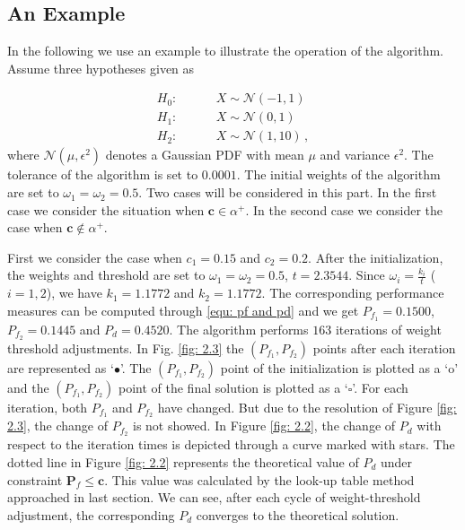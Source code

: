 \subsection{An Example}
In the following we use an example to illustrate the operation of the algorithm. Assume three hypotheses given as

\begin{equation}
\label{equ: Gaussian Hypothesis}
\begin{split}
	H_0:\;\;\;\;\;\;\;\;&X \sim \mathcal{N}(-1,1)\\
    H_1:\;\;\;\;\;\;\;\;&X \sim \mathcal{N}(0,1)\\
    H_2:\;\;\;\;\;\;\;\;&X \sim \mathcal{N}(1,10)\,,
\end{split}
\end{equation}
where $\mathcal{N}(\mu, \epsilon^2)$ denotes a Gaussian PDF with mean $\mu$ and variance $\epsilon^2$.
The tolerance of the algorithm is set to $0.0001$. The initial weights of the algorithm are set to $\omega_1 = \omega_2 = 0.5$. 
Two cases will be considered in this part. In the first case we consider the situation when $\mathbf{c} \in \alpha^+$. In the second case we consider the case when $\mathbf{c} \notin \alpha^+$.

First we consider the case when $c_1 = 0.15$ and $c_2 = 0.2$.
After the initialization, the weights and threshold are set to $\omega_1 = \omega_2 = 0.5$, $t =2.3544$. 
Since $\omega_i = \frac{k_i}{t}$ ($i = 1, 2$), we have $k_1 = 1.1772$ and $k_2 = 1.1772$. 
The corresponding performance measures can be computed through \eqref{equ: pf and pd} and we get $P_{f_1}  = 0.1500$, $P_{f_2} = 0.1445$ and $P_d = 0.4520$. The algorithm performs $163$ iterations of weight threshold adjustments. In Fig. \ref{fig: 2.3} the $(P_{f_1}, P_{f_2})$  points after each iteration are represented as `$\bullet$'. 
The $(P_{f_1}, P_{f_2})$ point of the initialization is plotted as  a `o' and the $(P_{f_1}, P_{f_2})$ point of the final solution is plotted as a `$\square$'. For each iteration, both $P_{f_1}$ and $P_{f_2}$ have changed. But due to the resolution of Figure \ref{fig: 2.3}, the change of $P_{f_2}$ is not showed. 
In Figure \ref{fig: 2.2}, the change of $P_d$ with respect to the iteration times is depicted through a curve marked with stars.   
The dotted line in Figure \ref{fig: 2.2} represents the theoretical value of $P_d$ under constraint $\mathbf{P}_f \leq \mathbf{c}$. This value was calculated by the look-up table method approached in last section. We can see, after each cycle of weight-threshold adjustment, the corresponding $P_d$ converges to the theoretical solution. 

